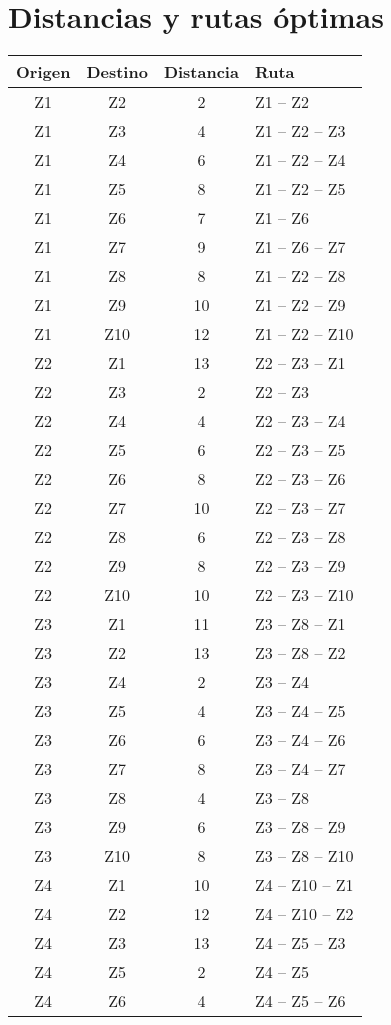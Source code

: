 \documentclass[a4paper,11pt]{article}
\begin{document}
\section*{Distancias y rutas \'optimas}
\begin{longtable}{c c c p{7cm}}
\hline
Origen & Destino & Distancia & Ruta \\\hline
\endhead
Z1 & Z2 & 2 & Z1 -- Z2 \\
Z1 & Z3 & 4 & Z1 -- Z2 -- Z3 \\
Z1 & Z4 & 6 & Z1 -- Z2 -- Z4 \\
Z1 & Z5 & 8 & Z1 -- Z2 -- Z5 \\
Z1 & Z6 & 7 & Z1 -- Z6 \\
Z1 & Z7 & 9 & Z1 -- Z6 -- Z7 \\
Z1 & Z8 & 8 & Z1 -- Z2 -- Z8 \\
Z1 & Z9 & 10 & Z1 -- Z2 -- Z9 \\
Z1 & Z10 & 12 & Z1 -- Z2 -- Z10 \\
Z2 & Z1 & 13 & Z2 -- Z3 -- Z1 \\
Z2 & Z3 & 2 & Z2 -- Z3 \\
Z2 & Z4 & 4 & Z2 -- Z3 -- Z4 \\
Z2 & Z5 & 6 & Z2 -- Z3 -- Z5 \\
Z2 & Z6 & 8 & Z2 -- Z3 -- Z6 \\
Z2 & Z7 & 10 & Z2 -- Z3 -- Z7 \\
Z2 & Z8 & 6 & Z2 -- Z3 -- Z8 \\
Z2 & Z9 & 8 & Z2 -- Z3 -- Z9 \\
Z2 & Z10 & 10 & Z2 -- Z3 -- Z10 \\
Z3 & Z1 & 11 & Z3 -- Z8 -- Z1 \\
Z3 & Z2 & 13 & Z3 -- Z8 -- Z2 \\
Z3 & Z4 & 2 & Z3 -- Z4 \\
Z3 & Z5 & 4 & Z3 -- Z4 -- Z5 \\
Z3 & Z6 & 6 & Z3 -- Z4 -- Z6 \\
Z3 & Z7 & 8 & Z3 -- Z4 -- Z7 \\
Z3 & Z8 & 4 & Z3 -- Z8 \\
Z3 & Z9 & 6 & Z3 -- Z8 -- Z9 \\
Z3 & Z10 & 8 & Z3 -- Z8 -- Z10 \\
Z4 & Z1 & 10 & Z4 -- Z10 -- Z1 \\
Z4 & Z2 & 12 & Z4 -- Z10 -- Z2 \\
Z4 & Z3 & 13 & Z4 -- Z5 -- Z3 \\
Z4 & Z5 & 2 & Z4 -- Z5 \\
Z4 & Z6 & 4 & Z4 -- Z5 -- Z6 \\

\end{longtable}
\end{document}
